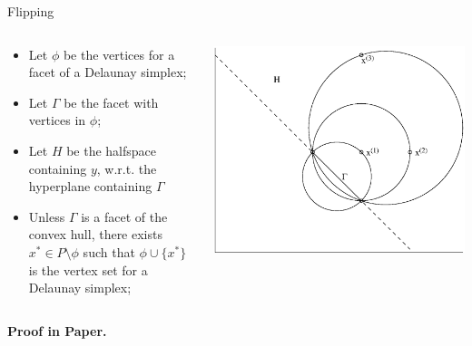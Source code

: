 \documentclass[aspectratio=169]{beamer}
\begin{document}
\begin{frame}{Flipping}
\begin{columns}
\begin{column}{.58\textwidth}
\begin{itemize}
\item Let $\phi$ be the vertices for a facet of a Delaunay simplex;
\item Let $\Gamma$ be the facet with vertices in $\phi$;
\item Let $H$ be the halfspace containing $y$,
w.r.t. the hyperplane containing $\Gamma$
\item Unless $\Gamma$ is a facet of the convex hull, there exists
$x^* \in P \setminus \phi$ such that $\phi \cup \{x^*\}$
is the vertex set for a Delaunay simplex;
\end{itemize}
\end{column}
\begin{column}{.4\textwidth}
\includegraphics[width=\textwidth]{circles.eps}
\end{column}
\end{columns}
\medskip
\centerline{\bf Proof in Paper.}
\end{frame}
\end{document}
